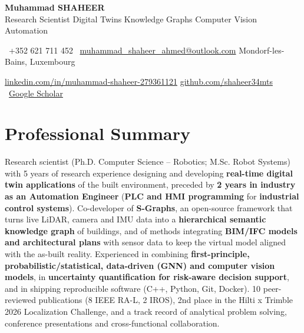 \documentclass[a4paper,11pt]{article}
\newcommand{\socialicon}[1]{\raisebox{-0.05em}{\resizebox{!}{1em}{#1}}}
\newcommand{\headerfontiii}{\fontfamily{ppl}\selectfont} %
\begin{document}
\headerfontiii

\begin{center}
    {\Huge\textbf{Muhammad SHAHEER}}\\[1mm]
    {\large Research Scientist \textbar{} Digital Twins \textbullet{} Knowledge Graphs \textbullet{} Computer Vision \textbullet{} Automation}
\end{center}
\vspace{-2mm}

\begin{center}
    \small{
    \faMobile \ +352 621 711 452 \textbar{} \faEnvelope \ \href{mailto:muhammad_shaheer_ahmed@outlook.com}{muhammad\_shaheer\_ahmed@outlook.com} \textbar{} Mondorf-les-Bains, Luxembourg
    }
\end{center}
\vspace{-4mm}

\begin{center}
    \small{
    \socialicon{\faLinkedin} \href{https://www.linkedin.com/in/muhammad-shaheer-279361121/}{linkedin.com/in/muhammad-shaheer-279361121} \textbar{}
    \socialicon{\faGithub} \href{https://github.com/shaheer34mts}{github.com/shaheer34mts} \textbar{}
    \faGraduationCap \ \href{https://scholar.google.com/citations?user=vjHnjjUAAAAJ&hl=en&oi=ao}{Google Scholar}
    }
\end{center}
\vspace{-5mm}

\section{\textbf{Professional Summary}}
\vspace{1mm}
\small{
Research scientist (Ph.D. Computer Science -- Robotics; M.Sc. Robot Systems) with 5 years of research experience designing and developing
\textbf{real-time digital twin applications} of the built environment, preceded by \textbf{2 years in industry as an Automation Engineer}
(\textbf{PLC and HMI programming} for \textbf{industrial control systems}). Co-developer of \textbf{S-Graphs}, an open-source framework that turns
live LiDAR, camera and IMU data into a \textbf{hierarchical semantic knowledge graph} of buildings, and of methods integrating
\textbf{BIM/IFC models and architectural plans} with sensor data to keep the virtual model aligned with the as-built reality.
Experienced in combining \textbf{first-principle, probabilistic/statistical, data-driven (GNN) and computer vision models}, in
\textbf{uncertainty quantification for risk-aware decision support}, and in shipping reproducible software (C++, Python, Git, Docker).
10 peer-reviewed publications (8 IEEE RA-L, 2 IROS), 2nd place in the Hilti x Trimble 2026 Localization Challenge, and a track record
of analytical problem solving, conference presentations and cross-functional collaboration.
}
\vspace{-2mm}
\end{document}
